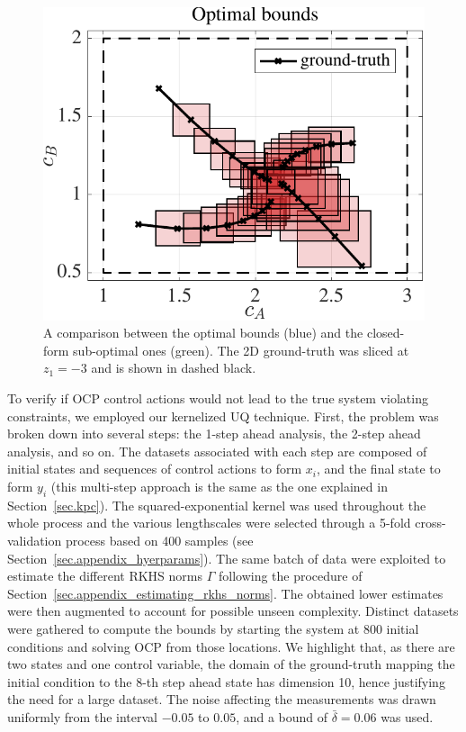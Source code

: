\begin{figure}[t]
	\includegraphics[scale=0.4]{../images/chap2_numex_ex3_phase_opt.pdf} 
	\caption{A comparison between the optimal bounds (blue) and the closed-form sub-optimal ones (green). The 2D ground-truth was sliced at $z_1 = -3$ and is shown in dashed black.}
\end{figure}

To verify if OCP control actions would not lead to the true system violating constraints, we employed our kernelized UQ technique. First, the problem was broken down into several steps: the 1-step ahead analysis, the 2-step ahead analysis, and so on. The datasets associated with each step are composed of initial states and sequences of control actions to form $x_i$, and the final state to form $y_i$ (this multi-step approach is the same as the one explained in Section~\ref{sec.kpc}). The squared-exponential kernel was used throughout the whole process and the various lengthscales were selected through a 5-fold cross-validation process based on 400 samples (see Section~\ref{sec.appendix_hyerparams}). The same batch of data were exploited to estimate the different RKHS norms $\Gamma$ following the procedure of Section~\ref{sec.appendix_estimating_rkhs_norms}. The obtained lower estimates were then augmented to account for possible unseen complexity. Distinct datasets were gathered to compute the bounds by starting the system at $800$ initial conditions and solving OCP from those locations. We highlight that, as there are two states and one control variable, the domain of the ground-truth mapping the initial condition to the 8-th step ahead state has dimension 10, hence justifying the need for a large dataset. The noise affecting the measurements was drawn uniformly from the interval $-0.05$ to $0.05$, and a bound of $\bar \delta = 0.06$ was used.

